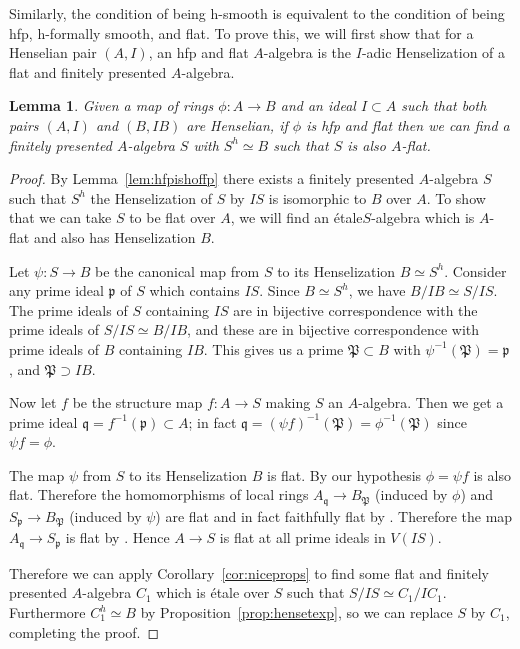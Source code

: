 \documentclass[12pt]{article}
\newcommand{\mf}[1]{\mathfrak{#1}}
\newcommand{\Et}{\'etale\xspace}
\newcommand{\hfp}{hfp\xspace}
\newcommand{\hsmooth}{h-smooth\xspace}
\newcommand{\hfsmooth}{h-formally smooth\xspace}
\newcommand{\spcite}[2]{\cite[\href{https://stacks.math.columbia.edu/tag/#1}{{#2} {#1}}]{stackp}}
\newtheorem{lemma}[theorem]{Lemma}
\theoremstyle{definition}
\numberwithin{equation}{subsection}
\begin{document}
Similarly, the condition of being \hsmooth is equivalent to the condition of being \hfp, \hfsmooth, and flat. To prove this, we will first show that for a Henselian pair $(A,I)$, an \hfp and flat $A$-algebra is the $I$-adic Henselization of a flat and finitely presented $A$-algebra.



\begin{lemma}\label{lem:flathfp} Given a map of rings $\phi: A \to B$ and an ideal $I \subset A$ such that both pairs $(A,I)$ and $(B,IB)$ are Henselian, if $\phi$ is \hfp and flat then we can find a finitely presented $A$-algebra $S$ with $S^h \simeq B$ such that $S$ is also $A$-flat.
\end{lemma}
\begin{proof}

By Lemma~\ref{lem:hfpishoffp} there exists a finitely presented $A$-algebra $S$ such that $S^h$ the Henselization of $S$ by $IS$ is isomorphic to $B$ over $A$. To show that we can take $S$ to be flat over $A$, we will find an \Et $S$-algebra which is $A$-flat and also has Henselization $B$.


Let $\psi: S \to B$ be the canonical map from $S$ to its Henselization $B \simeq S^h$. Consider any prime ideal $\mf{p}$ of $S$ which contains $IS$. Since $B \simeq S^h$, we have $B/IB \simeq S/IS$. The prime ideals of $S$ containing $IS$ are in bijective correspondence with the prime ideals of $S/IS \simeq B/IB$, and these are in bijective correspondence with prime ideals of $B$ containing $IB$. This gives us a prime $\mf{P} \subset B$ with $\psi^{-1}(\mf{P})=\mf{p}$, and $\mf{P} \supset IB$.



Now let $f$ be the structure map $f: A \to S$ making $S$ an $A$-algebra. Then we get a prime ideal $\mf{q} = f^{-1}(\mf{p}) \subset A$; in fact $\mf{q}=(\psi f)^{-1}(\mf{P}) = \phi^{-1}(\mf{P})$ since $\psi f = \phi$.

The map $\psi$ from $S$ to its Henselization $B$ is flat. By our hypothesis $\phi=\psi f $ is also flat. Therefore the homomorphisms of local rings $A_{\mf{q}} \to B_{\mf{P}}$ (induced by $\phi$) and $S_{\mf{p}} \to B_{\mf{P}}$ (induced by $\psi$) are flat and in fact faithfully flat by \spcite{00HR}{Lemma}. Therefore the map $A_{\mf{q}} \to S_{\mf{p}}$ is flat by \spcite{039V}{Lemma}. Hence $A \to S$ is flat at all prime ideals in $V(IS)$. 

Therefore we can apply Corollary~\ref{cor:niceprops} to find some flat and finitely presented $A$-algebra $C_1$  which is \Et over $S$ such that $S/IS \simeq C_1/IC_1$. Furthermore $C_1^h \simeq B$ by Proposition~\ref{prop:hensetexp}, so we can replace $S$ by $C_1$, completing the proof.\end{proof}
\end{document}
